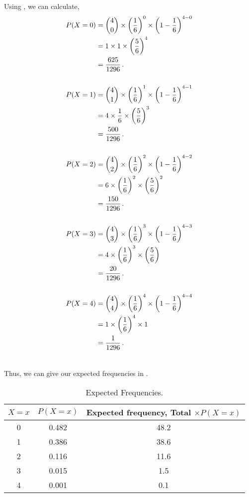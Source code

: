 \begin{subquestions}
Using , we can calculate,
\begin{align}
	P(X=0) & = { 4 \choose 0} \times \left(\frac{1}{6} \right)^0 \times \left(1-\frac{1}{6} \right)^{4-0} \nonumber \\
	       & = 1 \times 1 \times \left(\frac{5}{6} \right)^{4} \nonumber \\
	       & = \frac{625}{1296} \,. \\ \nonumber \\
	P(X=1) & = { 4 \choose 1} \times \left(\frac{1}{6} \right)^1 \times \left(1-\frac{1}{6} \right)^{4-1} \nonumber \\
		   & = 4 \times \frac{1}{6} \times \left(\frac{5}{6} \right)^{3} \nonumber \\
		   & = \frac{500}{1296} \,. \\ \nonumber \\
	P(X=2) & = { 4 \choose 2} \times \left(\frac{1}{6} \right)^2 \times \left(1-\frac{1}{6} \right)^{4-2} \nonumber \\
		   & = 6 \times \left(\frac{1}{6}\right)^2 \times \left(\frac{5}{6} \right)^{2} \nonumber \\
		   & = \frac{150}{1296} \,. \\ \nonumber \\
	P(X=3) & = { 4 \choose 3} \times \left(\frac{1}{6} \right)^3 \times \left(1-\frac{1}{6} \right)^{4-3} \nonumber \\
		   & = 4 \times \left(\frac{1}{6}\right)^3 \times \left(\frac{5}{6} \right) \nonumber \\
      	   & = \frac{20}{1296} \,. \\ \nonumber \\
    P(X=4) & = { 4 \choose 4} \times \left(\frac{1}{6} \right)^4 \times \left(1-\frac{1}{6} \right)^{4-4} \nonumber \\
    	   & = 1 \times \left(\frac{1}{6}\right)^4 \times 1 \nonumber \\
    	   & = \frac{1}{1296} \,. \\ \nonumber \\
\end{align}

Thus, we can give our expected frequencies in .
	
\begin{table}[H]
	\centering
	\begin{tabular}{|c|c|c|}
		\hline
		$X=x$ & $P(X=x)$ & Expected frequency, Total $\times P(X=x)$ \\
		\hline
		0 & 0.482 & 48.2 \\
		1 & 0.386 & 38.6 \\
		2 & 0.116 & 11.6 \\
		3 & 0.015 & 1.5 \\
		4 & 0.001 & 0.1 \\
		\hline
	\end{tabular}
	\caption{\label{2008M:q3:Bin1} Expected Frequencies.}
\end{table}


\end{subquestions}
